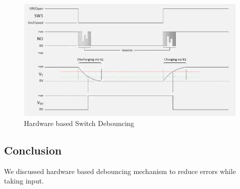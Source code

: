 \documentclass[a4paper]{article} %
\begin{document}
        \begin{figure}[h!]
            \centering
            \includegraphics[width=\textwidth]{Assignment 5/2_hardware debouncing/graph.png}
            \caption{Hardware based Switch Debouncing}
            \label{fg14}
        \end{figure}

    \subsection{Conclusion}
        We discussed hardware based debouncing mechanism to reduce errors while taking input.
\newpage
\end{document}
